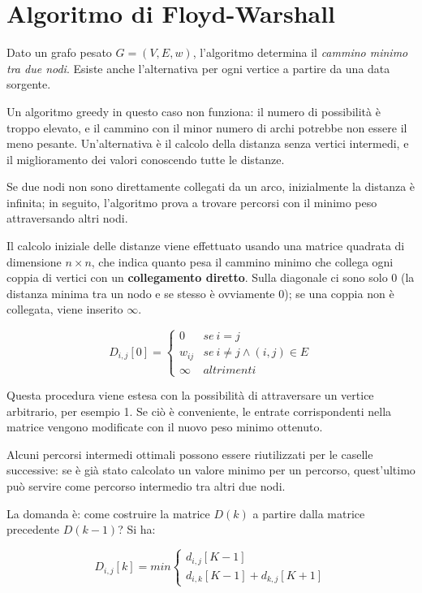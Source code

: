 \section{Algoritmo di Floyd-Warshall}
Dato un grafo pesato $G = (V, E, w)$, l'algoritmo determina il \textit{cammino minimo tra due nodi}. Esiste anche l'alternativa per ogni vertice a partire da una data sorgente.

Un algoritmo greedy in questo caso non funziona: il numero di possibilità è troppo elevato, e il cammino con il minor numero di archi potrebbe non essere il meno pesante. Un'alternativa è il calcolo della distanza senza vertici intermedi, e il miglioramento dei valori conoscendo tutte le distanze.

Se due nodi non sono direttamente collegati da un arco, inizialmente la distanza è infinita; in seguito, l'algoritmo prova a trovare percorsi con il minimo peso attraversando altri nodi.

Il calcolo iniziale delle distanze viene effettuato usando una matrice quadrata di dimensione $n \times n$, che indica quanto pesa il cammino minimo che collega ogni coppia di vertici con un \textbf{collegamento diretto}. Sulla diagonale ci sono solo 0 (la distanza minima tra un nodo e se stesso è ovviamente 0); se una coppia non è collegata, viene inserito $\infty$.

$$D_{i, j}  [0] = \begin{cases}
0 & se\ i = j \\
w_{ij} & se\ i \neq j \land (i, j) \in E \\
\infty & altrimenti
\end{cases}$$

Questa procedura viene estesa con la possibilità di attraversare un vertice arbitrario, per esempio 1. Se ciò è conveniente, le entrate corrispondenti nella matrice vengono modificate con il nuovo peso minimo ottenuto.

Alcuni percorsi intermedi ottimali possono essere riutilizzati per le caselle successive: se è già stato calcolato un valore minimo per un percorso, quest'ultimo può servire come percorso intermedio tra altri due nodi. 

La domanda è: come costruire la matrice $D(k)$ a partire dalla matrice precedente $D(k-1)$? Si ha:

$$D_{i, j}  [k] = min \begin{cases}
d_{i, j}[K-1] \\
d_{i, k}[K-1] + d_{k, j}[K+1]
\end{cases}$$

